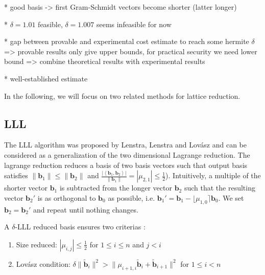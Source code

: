   * good basis -> first Gram-Schmidt vectors become shorter (latter longer)

  * $\delta = 1.01$ feasible, $\delta = 1.007$ seems infeasible for now

  * gap between provable and experimental cost estimate to reach some hermite $\delta$ => provable results only give upper bounds, for practical security we need lower bound => combine theoretical results with experimental results

  * well-established estimate \cite{LP11}

In the following, we will focus on two related methods for lattice reduction. %

\subsection{LLL}
The LLL algorithm was proposed by Lenstra, Lenstra and Lovász \cite{LLL82} and can be considered as a generalization of the two dimensional Lagrange reduction. The lagrange reduction reduces a basis of two basis vectors such that output basis satisfies $\|\mathbf{b}_1\| \leq \|\mathbf{b}_2\|$ and $\frac{|\left\langle\mathbf{b}_1, \mathbf{b}_2\right\rangle|}{\|\mathbf{b}_1\|} = |\mu_{2,1}| \leq \frac{1}{2}$). Intuitively, a multiple of the shorter vector $\mathbf{b}_1$ is subtracted from the longer vector $\mathbf{b}_2$ such that the resulting vector $\mathbf{b}_2'$ is as orthogonal to $\mathbf{b}_0$ as possible, i.e.  $\mathbf{b}_1' =  \mathbf{b}_1 - \lfloor\mu_{1,0}\rceil \mathbf{b}_0$. We set $\mathbf{b}_2 = \mathbf{b}_2'$ and repeat until nothing changes. 

A $\delta$-LLL reduced basis ensures two criterias \cite{LLL82}:
\begin{enumerate}
  \item Size reduced: $|\mu_{i,j}| \leq \frac{1}{2}$ for $1\leq i \leq n$ and $j < i$ \label{size-red}
  \item Lovász condition: $\delta \| \tilde{\mathbf{b}}_i \|^2 > \| \mu_{i+1, i} \tilde{\mathbf{b}}_i + \tilde{\mathbf{b}}_{i+1} \|^2$ for $1\leq i < n$
\end{enumerate}

